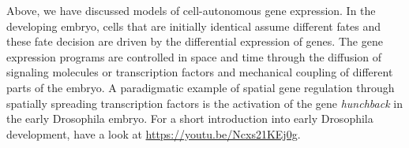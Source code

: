 



Above, we have discussed models of cell-autonomous gene expression.
In the developing embryo, cells that are initially identical assume different fates and these fate decision are driven by the differential expression of genes.
The gene expression programs are controlled in space and time through the diffusion of signaling molecules or transcription factors and mechanical coupling of different parts of the embryo.
A paradigmatic example of spatial gene regulation through spatially spreading transcription factors is the activation of the gene \emph{hunchback} in the early Drosophila embryo.
For a short introduction into early Drosophila development, have a look at \url{https://youtu.be/Ncxs21KEj0g}.

